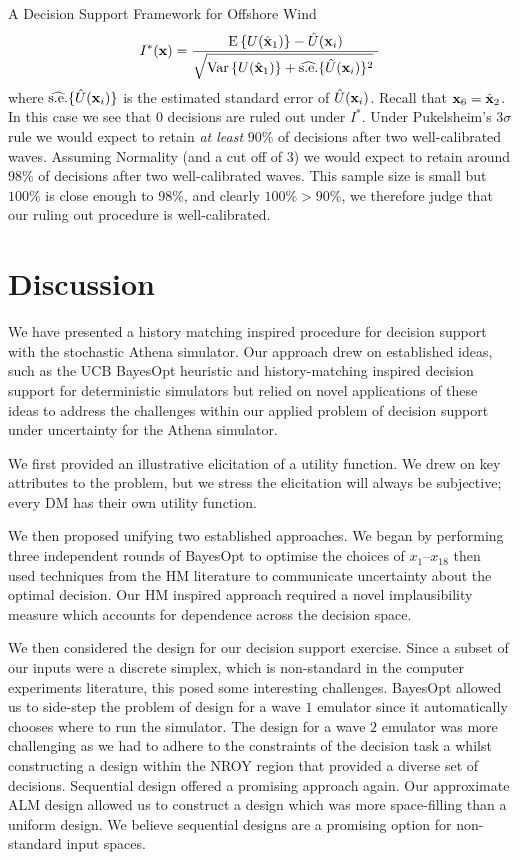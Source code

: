 \begin{chapter}{A Decision Support Framework for Offshore Wind \label{Ch:ds-for-ow}}
\begin{equation}
 I^{*}(\mathbf{x}) = \frac{\textrm{E}\,\{U(\hat{\mathbf{x}}_1)\} - \hat{U}(\mathbf{x}_i) }{ \sqrt{ \mathrm{Var}\,\{U(\hat{\mathbf{x}}_1)\} + \widehat{ \text{s.e.} }\{\hat{U}(\mathbf{x}_i)\}^2 }\ }
\end{equation}
where $\widehat{ \text{s.e.} }\{\hat{U}(\mathbf{x}_i)\}$ is the estimated standard error of $\hat{U}(\mathbf{x}_i)$. Recall that $\mathbf{x}_6 = \hat{\mathbf{x}}_2$. In this case we see that $0$ decisions are ruled out under $I^{*}$. Under Pukelsheim's $3\sigma$ rule we would expect to retain \textit{at least} $90\%$ of decisions after two well-calibrated waves. Assuming Normality (and a cut off of $3$) we would expect to retain around $98\%$ of decisions after two well-calibrated waves. This sample size is small but $100\%$ is close enough to $98\%$, and clearly $100\% > 90\%$, we therefore judge that our ruling out procedure is well-calibrated.

\section{Discussion}

We have presented a history matching inspired procedure for decision support with the stochastic Athena simulator. Our approach drew on established ideas, such as the UCB BayesOpt heuristic \citep{Srinivas2009} and history-matching inspired decision support for deterministic simulators \citep{Owen2020} but relied on novel applications of these ideas to address the challenges within our applied problem of decision support under uncertainty for the Athena simulator.

We first provided an illustrative elicitation of a utility function. We drew on key attributes to the problem, but we stress the elicitation will always be subjective; every DM has their own utility function.

We then proposed unifying two established approaches. We began by performing three independent rounds of BayesOpt to optimise the choices of $x_1$--$x_{18}$ then used techniques from the HM literature to communicate uncertainty about the optimal decision. Our HM inspired approach required a novel implausibility measure which accounts for dependence across the decision space.

We then considered the design for our decision support exercise. Since a subset of our inputs were a discrete simplex, which is non-standard in the computer experiments literature, this posed some interesting challenges. BayesOpt allowed us to side-step the problem of design for a wave $1$ emulator since it automatically chooses where to run the simulator. The design for a wave $2$ emulator was more challenging as we had to adhere to the constraints of the decision task a whilst constructing a design within the NROY region that provided a diverse set of decisions. Sequential design offered a promising approach again. Our approximate ALM design allowed us to construct a design which was more space-filling than a uniform design. We believe sequential designs are a promising option for non-standard input spaces.


\end{chapter}
